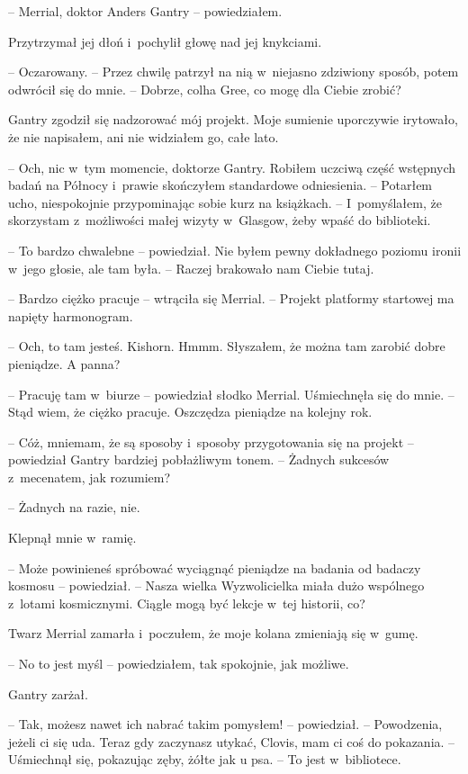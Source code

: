 \documentclass[oneside,polish,11pt,sfheadings]{mwbk}
\begin{document}
-- Merrial, doktor Anders Gantry -- powiedziałem.

Przytrzymał jej dłoń i~pochylił głowę nad jej knykciami. 

-- Oczarowany. -- Przez chwilę patrzył na nią w~niejasno zdziwiony sposób, potem odwrócił się do mnie. -- Dobrze, colha Gree, co mogę dla Ciebie zrobić?

Gantry zgodził się nadzorować mój projekt. Moje sumienie uporczywie
irytowało, że nie napisałem, ani nie widziałem go, całe lato.

-- Och, nic w~tym momencie, doktorze Gantry. Robiłem uczciwą część
wstępnych badań na Północy i~prawie skończyłem standardowe odniesienia.
-- Potarłem ucho, niespokojnie przypominając sobie kurz na książkach. -- I~pomyślałem, że skorzystam z~możliwości małej wizyty w~Glasgow, żeby
wpaść do biblioteki.

-- To bardzo chwalebne -- powiedział. Nie byłem pewny dokładnego poziomu
ironii w~jego głosie, ale tam była. -- Raczej brakowało nam Ciebie tutaj.

-- Bardzo ciężko pracuje -- wtrąciła się Merrial. -- Projekt platformy
startowej ma napięty harmonogram.

-- Och, to tam jesteś. Kishorn. Hmmm. Słyszałem, że można tam zarobić
dobre pieniądze. A panna?

-- Pracuję tam w~biurze -- powiedział słodko Merrial. Uśmiechnęła się do
mnie. -- Stąd wiem, że ciężko pracuje. Oszczędza pieniądze na kolejny
rok.

-- Cóż, mniemam, że są sposoby i~sposoby przygotowania się na projekt -- powiedział Gantry bardziej pobłażliwym tonem. -- Żadnych sukcesów z~mecenatem, jak rozumiem?

-- Żadnych na razie, nie.

Klepnął mnie w~ramię. 

-- Może powinieneś spróbować wyciągnąć pieniądze na
badania od badaczy kosmosu -- powiedział. -- Nasza wielka Wyzwolicielka
miała dużo wspólnego z~lotami kosmicznymi. Ciągle mogą być lekcje w~tej
historii, co?

Twarz Merrial zamarła i~poczułem, że moje kolana zmieniają się w~gumę.

-- No to jest myśl -- powiedziałem, tak spokojnie, jak możliwe.

Gantry zarżał. 

-- Tak, możesz nawet ich nabrać takim pomysłem! -- powiedział. -- Powodzenia, jeżeli ci się uda. Teraz gdy zaczynasz utykać,
Clovis, mam ci coś do pokazania. -- Uśmiechnął się, pokazując zęby, żółte
jak u psa. -- To jest w~bibliotece.
\end{document}
